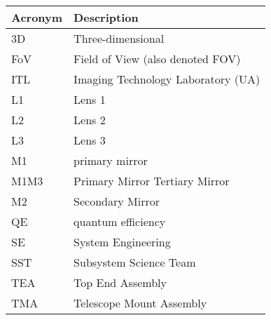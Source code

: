 \addtocounter{table}{-1}
\begin{longtable}{p{}p{}}\hline
\textbf{Acronym} & \textbf{Description}  \\\hline

3D & Three-dimensional \\\hline
FoV & Field of View (also denoted FOV) \\\hline
ITL & Imaging Technology Laboratory (UA) \\\hline
L1 & Lens 1 \\\hline
L2 & Lens 2 \\\hline
L3 & Lens 3 \\\hline
M1 & primary mirror \\\hline
M1M3 & Primary Mirror Tertiary Mirror \\\hline
M2 & Secondary Mirror \\\hline
QE & quantum efficiency \\\hline
SE & System Engineering \\\hline
SST & Subsystem Science Team \\\hline
TEA & Top End Assembly \\\hline
TMA & Telescope Mount Assembly \\\hline
\end{longtable}
